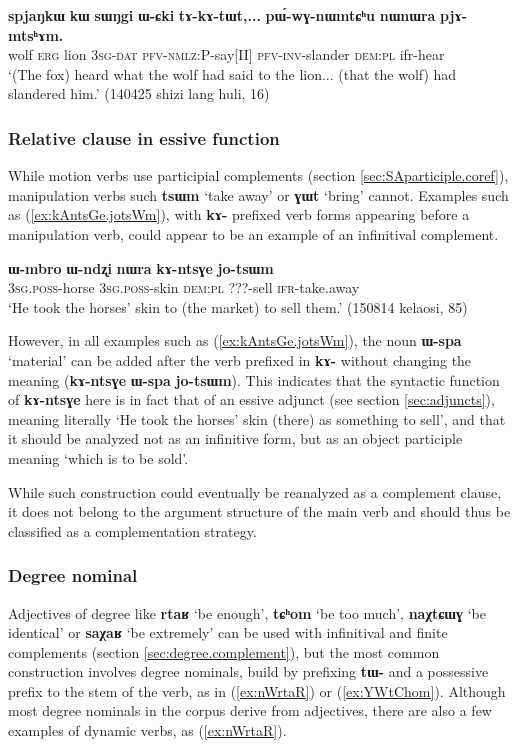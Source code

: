 \documentclass[oneside,a4paper,11pt]{article}
\newcommand{\ipa}[1]{\textbf{\phon#1}} %
\newcommand{\jpg}[2]{\ipa{#1} `#2'} %
\begin{document}
\begin{exe}
\ex \label{ex:pWwGnWmtChu}
\gll 
\ipa{spjaŋkɯ} 	\ipa{kɯ} 	\ipa{sɯŋgi} 	\ipa{ɯ-ɕki} 	\ipa{tɤ-kɤ-tɯt,...} 	\ipa{pɯ́-wɣ-nɯmtɕʰu} 	\ipa{nɯnɯra} 	\ipa{pjɤ-mtsʰɤm.} \\
wolf \textsc{erg} lion \textsc{3sg-dat} \textsc{pfv-nmlz:P}-say[II] \textsc{pfv-inv}-slander \textsc{dem:pl} ifr-hear \\
\glt `(The fox) heard what the wolf had said to the lion... (that the wolf) had slandered him.' (140425 shizi lang huli, 16)
\end{exe}

\subsubsection{Relative clause in essive function} \label{sec:essive}
While motion verbs use participial complements (section \ref{sec:SAparticiple.coref}), manipulation verbs such \jpg{tsɯm}{take away} or \jpg{ɣɯt}{bring} cannot. Examples such as (\ref{ex:kAntsGe.jotsWm}), with \ipa{kɤ-} prefixed verb forms appearing before a manipulation verb, could appear to be an example of an infinitival complement.

\begin{exe}
\ex \label{ex:kAntsGe.jotsWm}
\gll \ipa{ɯ-mbro} 	\ipa{ɯ-ndʐi} 	\ipa{nɯra} 	\ipa{kɤ-ntsɣe} 	\ipa{jo-tsɯm} \\
\textsc{3sg.poss}-horse \textsc{3sg.poss}-skin \textsc{dem:pl} ???-sell \textsc{ifr}-take.away \\
\glt `He took the horses' skin to (the market) to sell them.' (150814 kelaosi, 85)
\end{exe}

However, in all examples such as (\ref{ex:kAntsGe.jotsWm}), the noun \jpg{ɯ-spa}{material} can be added after the verb prefixed in \ipa{kɤ-} without changing the meaning (\ipa{kɤ-ntsɣe} \ipa{ɯ-spa} \ipa{jo-tsɯm}). This indicates that the syntactic function of \ipa{kɤ-ntsɣe} here is in fact that of an essive adjunct (see section \ref{sec:adjuncts}), meaning literally `He took the horses' skin (there) as something to sell', and that it should be analyzed not as an infinitive form, but as an object participle meaning `which is to be sold'.

While such construction could eventually be reanalyzed as a complement clause, it does not belong to the argument structure of the main verb and should thus be classified as a complementation strategy.


  \subsubsection{Degree nominal}  \label{sec:degree}
Adjectives of degree like \jpg{rtaʁ}{be enough}, \jpg{tɕʰom}{be too much}, \jpg{naχtɕɯɣ}{be identical} or \jpg{saχaʁ}{be extremely} can be used with infinitival and finite complements (section \ref{sec:degree.complement}), but the most common construction involves degree nominals, build by prefixing \ipa{tɯ-} and a possessive prefix to the stem of the verb, as in (\ref{ex:nWrtaR}) or (\ref{ex:YWtChom}). Although most degree nominals in the corpus derive from adjectives, there are also a few examples of dynamic verbs, as (\ref{ex:nWrtaR}).
\end{document}
